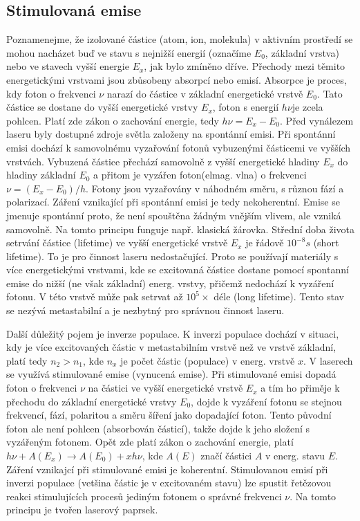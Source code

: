 \documentclass[a4paper,12pt]{article}
\begin{document}
\subsection{Stimulovaná emise}
Poznamenejme, že izolované částice (atom, ion, molekula) v aktivním prostředí se mohou nacházet buď ve stavu s nejnižší energií (označíme $E_0$, základní vrstva) nebo ve stavech vyšší energie $E_x$, jak bylo zmíněno dříve. Přechody mezi těmito energetickými vrstvami jsou zbůsobeny absorpcí nebo emisí.
Absorpce je proces, kdy foton o frekvenci $\nu$ narazí do částice v základní energetické vrstvě $E_0$. Tato částice se dostane do vyšší energetické vrstvy $E_x$, foton s energií $h\nu$je zcela pohlcen. Platí zde zákon o zachování energie, tedy $h\nu = E_x - E_0$.
Před vynálezem laseru byly dostupné zdroje světla založeny na spontánní emisi. Při spontánní emisi dochází k samovolnému vyzařování fotonů vybuzenými částicemi ve vyšších vrstvách. Vybuzená částice přechází samovolně z vyšší energetické hladiny $E_x$ do hladiny základní $E_0$ a přitom je vyzářen foton(elmag. vlna) o frekvenci $\nu = (E_x-E_0)/h$. Fotony jsou vyzařovány v náhodném směru, s různou fází a polarizací. Záření vznikající při spontánní emisi je tedy nekoherentní. Emise se jmenuje spontánní proto, že není spouštěna žádným vnějším vlivem, ale vzniká samovolně. Na tomto principu funguje např. klasická žárovka.
Střední doba života setrvání částice (lifetime) ve vyšší energetické vrstvě $E_x$ je řádově $10^{-8}s$ (short lifetime). To je pro činnost laseru nedostačující. Proto se používají materiály s více energetickými vrstvami, kde se excitovaná částice dostane pomocí spontanní emise do nižší (ne však základní) energ. vrstvy, přičemž nedochází k vyzáření fotonu. V této vrstvě může pak setrvat až $10^{5}\times$ déle (long lifetime). Tento stav se nezývá metastabilní a je nezbytný pro správnou činnost laseru.

Další důležitý pojem je inverze populace. K inverzi populace dochází v situaci, kdy je více excitovaných částic v metastabilním vrstvě než ve vrstvě základní, platí tedy $n_2 > n_1$, kde $n_x$ je počet částic (populace) v energ. vrstvě $x$.
V laserech se využívá stimulované emise (vynucená emise). Při stimulované emisi dopadá foton o frekvenci $\nu$ na částici ve vyšší energetické vrstvě $E_x$ a tím ho přiměje k přechodu do základní energetické vrstvy $E_0$, dojde k vyzáření fotonu se stejnou frekvencí, fází, polaritou a směru šíření jako dopadající foton. Tento původní foton ale není pohlcen (absorbován částicí), takže dojde k jeho složení s vyzářeným fotonem. Opět zde platí zákon o zachování energie, platí $h\nu + A(E_x) \rightarrow A(E_0) + xh\nu$, kde $A(E)$ značí částici $A$ v energ. stavu $E$. Záření vznikajcí při stimulované emisi je koherentní. Stimulovanou emisí při inverzi populace (vetšina částic je v excitovaném stavu) lze spustit řetězovou reakci stimulujících procesů jediným fotonem o správné frekvenci $\nu$.
Na tomto principu je tvořen laserový paprsek.
\end{document}
